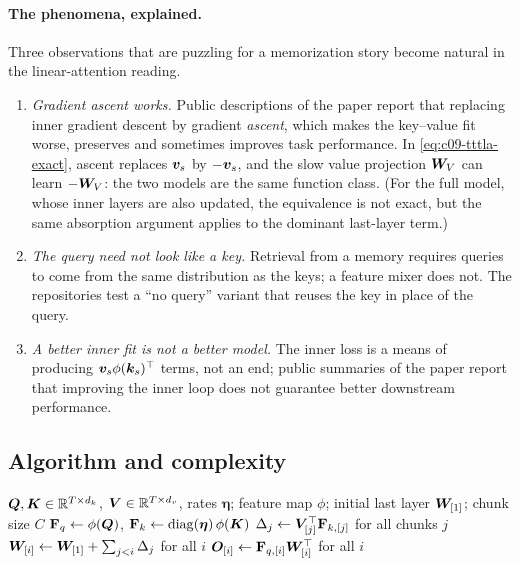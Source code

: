 \paragraph{The phenomena, explained.} Three observations that are puzzling for a memorization
story become natural in the linear-attention reading.
\begin{enumerate}
  \item \emph{Gradient ascent works.} Public descriptions of the paper report that replacing
        inner gradient descent by gradient \emph{ascent}, which makes the key--value fit worse,
        preserves and sometimes improves task performance. In \eqref{eq:c09-tttla-exact},
        ascent replaces $\bm{v}_s$ by $-\bm{v}_s$, and the slow value projection $\bm{W}_V$ can learn
        $-\bm{W}_V$: the two models are the same function class. (For the full model, whose inner
        layers are also updated, the equivalence is not exact, but the same absorption argument
        applies to the dominant last-layer term.)
  \item \emph{The query need not look like a key.} Retrieval from a memory requires queries to
        come from the same distribution as the keys; a feature mixer does not. The repositories
        test a ``no query'' variant that reuses the key in place of the query.
  \item \emph{A better inner fit is not a better model.} The inner loss is a means of producing
        $\bm{v}_s\phi(\bm{k}_s)^{\top}$ terms, not an end; public summaries of the paper report that
        improving the inner loop does not guarantee better downstream performance.
\end{enumerate}

\subsection{Algorithm and complexity}

\begin{algorithm}[t]
\caption{TTT layer with a linear last layer and dot-product loss, computed in parallel.}
\label{alg:c09-tttla}
\begin{algorithmic}[1]
\Require $\bm{Q},\bm{K}\in\mathbb{R}^{T\times d_k}$, $\bm{V}\in\mathbb{R}^{T\times d_v}$, rates $\bm{\eta}$; feature map $\phi$; initial last layer $\bm{W}_{[1]}$; chunk size $C$
\State $\mathbf{F}_q \gets \phi(\bm{Q})$, $\mathbf{F}_k \gets \operatorname{diag}(\bm{\eta})\,\phi(\bm{K})$ 
\State $\Delta_j \gets \bm{V}_{[j]}^{\top}\mathbf{F}_{k,[j]}$ for all chunks $j$ 
\State $\bm{W}_{[i]} \gets \bm{W}_{[1]} + \sum_{j<i}\Delta_j$ for all $i$ 
\State $\bm{O}_{[i]} \gets \mathbf{F}_{q,[i]}\bm{W}_{[i]}^{\top}$ for all $i$
\end{algorithmic}
\end{algorithm}

